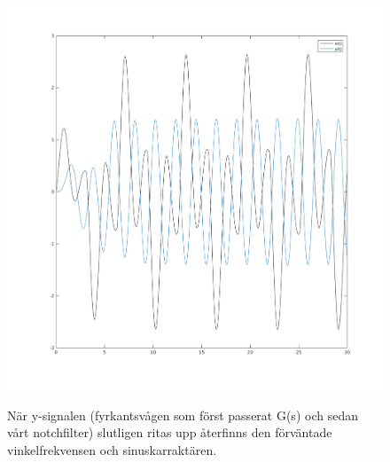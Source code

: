 \begin{figure}
    \caption{När y-signalen (fyrkantsvågen som först passerat G(s) och sedan
    vårt notchfilter) slutligen ritas upp återfinns den förväntade
    vinkelfrekvensen och sinuskarraktären.}
    \centering
    \includegraphics[scale=0.55]{figures/task4e-y-sys2.png}
    \label{fig:task4e-y-sys2}
\end{figure}
